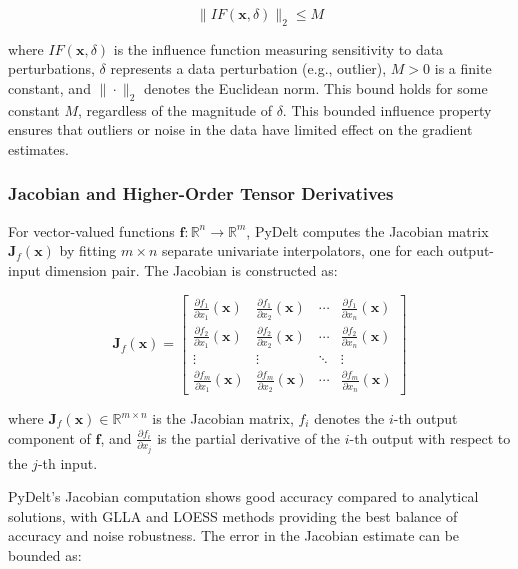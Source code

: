 \documentclass[10pt,journal,compsoc]{IEEEtran}
\begin{document}
\begin{equation}
    \|IF(\mathbf{x}, \delta)\|_2 \leq M
\end{equation}

where $IF(\mathbf{x}, \delta)$ is the influence function measuring sensitivity to data perturbations, $\delta$ represents a data perturbation (e.g., outlier), $M > 0$ is a finite constant, and $\|\cdot\|_2$ denotes the Euclidean norm. This bound holds for some constant $M$, regardless of the magnitude of $\delta$. This bounded influence property ensures that outliers or noise in the data have limited effect on the gradient estimates.

\subsubsection{Jacobian and Higher-Order Tensor Derivatives}

For vector-valued functions $\mathbf{f}: \mathbb{R}^n \rightarrow \mathbb{R}^m$, PyDelt computes the Jacobian matrix $\mathbf{J}_f(\mathbf{x})$ by fitting $m \times n$ separate univariate interpolators, one for each output-input dimension pair. The Jacobian is constructed as:

\begin{equation}
    \mathbf{J}_f(\mathbf{x}) = \begin{bmatrix}
    \frac{\partial f_1}{\partial x_1}(\mathbf{x}) & \frac{\partial f_1}{\partial x_2}(\mathbf{x}) & \cdots & \frac{\partial f_1}{\partial x_n}(\mathbf{x}) \\
    \frac{\partial f_2}{\partial x_1}(\mathbf{x}) & \frac{\partial f_2}{\partial x_2}(\mathbf{x}) & \cdots & \frac{\partial f_2}{\partial x_n}(\mathbf{x}) \\
    \vdots & \vdots & \ddots & \vdots \\
    \frac{\partial f_m}{\partial x_1}(\mathbf{x}) & \frac{\partial f_m}{\partial x_2}(\mathbf{x}) & \cdots & \frac{\partial f_m}{\partial x_n}(\mathbf{x})
    \end{bmatrix}
\end{equation}

where $\mathbf{J}_f(\mathbf{x}) \in \mathbb{R}^{m \times n}$ is the Jacobian matrix, $f_i$ denotes the $i$-th output component of $\mathbf{f}$, and $\frac{\partial f_i}{\partial x_j}$ is the partial derivative of the $i$-th output with respect to the $j$-th input.

PyDelt's Jacobian computation shows good accuracy compared to analytical solutions, with GLLA and LOESS methods providing the best balance of accuracy and noise robustness. The error in the Jacobian estimate can be bounded as:
\end{document}
